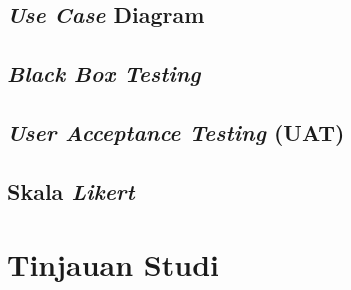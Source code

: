 \begin{flushleft}
\begin{justify}
        \subsection{\textit{Use Case} Diagram}

        \subsection{\textit{Black Box Testing}}

        \subsection{\textit{User Acceptance Testing} (UAT)}

        \subsection{Skala \textit{Likert}}

    \end{justify}

    \vspace{2cm}
\section{Tinjauan Studi}

\end{flushleft}



\newpage